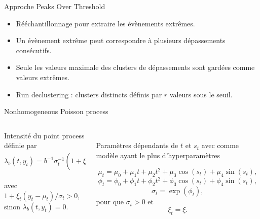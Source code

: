 \documentclass[aspectratio=169]{beamer}
\begin{document}
\begin{frame}{Approche Peaks Over Threshold}
\begin{itemize}
	\setlength{\itemsep}{17pt}
	\item Rééchantillonnage pour extraire les évènements extrêmes.
	\item Un évènement extrême peut correspondre à plusieurs dépassements consécutifs.
	\item Seule les valeurs maximale des clusters de dépassements sont gardées comme valeurs extrêmes.
	\item Run declustering : clusters distincts définis par $r$ valeurs sous le seuil.
\end{itemize}
\end{frame}


\begin{frame}{Nonhomogeneous Poisson process}
\begin{columns}
	\begin{column}{0.5\textwidth}
		Intensité du point process définie par
		\vspace{0.1cm} \\
		\begin{equation*}
		\lambda_b(t,y_t) = b^{-1}\sigma_t^{-1} \left( 1+\xi_t\dfrac{y_t-\mu_t}{\sigma_t} \right)^{-1/\xi_t-1}
		\end{equation*}
		\vspace{0.2cm} \\
		avec $1+\xi_t(y_t-\mu_t)/\sigma_t > 0$, \\ sinon $\lambda_b(t,y_t) = 0$.
	\end{column}
	\begin{column}{0.5\textwidth}
	\vspace{0.5cm} \\
		Paramètres dépendants de $t$ et $s_t$ avec comme modèle ayant le plus d'hyperparamètres
		\begin{fleqn}
		\begin{equation*}
		\mu_t = \mu_0 + \mu_1 t + \mu_2 t^2 + \mu_3 \cos(s_t) + \mu_4 \sin(s_t),
		\end{equation*}
		\begin{equation*}
		\phi_t = \phi_0 + \phi_1 t + \phi_2 t^2 + \phi_3 \cos(s_t) + \phi_4 \sin(s_t),
		\end{equation*}
		\begin{equation*}
		\sigma_t = \exp(\phi_t),
		\end{equation*}
		pour que $\sigma_t > 0$ et
		\begin{equation*}
		\xi_t = \xi.
		\end{equation*}
		\end{fleqn}
	\end{column}
\end{columns}
	\vspace{1cm}
	{\scriptsize
	\cite{northrop_threshold_2016}}
\end{frame}
\end{document}
